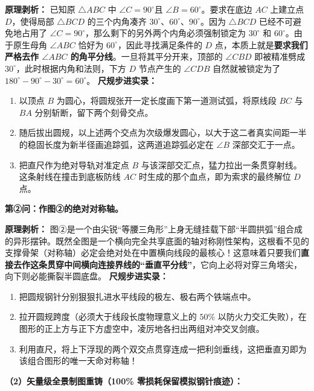 \documentclass[12pt, a4paper]{ctexrep}
\begin{document}
\textbf{原理剥析：} 已知原 $\triangle ABC$ 中 $\angle C = 90^\circ$且 $\angle B = 60^\circ$。要求在底边 $AC$ 上建立点 $D$，使得局部 $\triangle BCD$ 的三个内角凑齐 $30^\circ$、$60^\circ$、$90^\circ$。因为 $\triangle BCD$ 已经不可避免地占用了 $\angle C = 90^\circ$，那么剩下的另外两个内角必须强制锁定为 $30^\circ$ 和 $60^\circ$。由于原生母角 $\angle ABC$ 恰好为 $60^\circ$，因此寻找满足条件的 $D$ 点，本质上就是\textbf{要求我们严格去作 $\angle ABC$ 的角平分线}。一旦将其平分开来，顶部的 $\angle CBD$ 即被精准劈成 $30^\circ$，此时根据内角和法则，下方 $D$ 节点产生的 $\angle CDB$ 自然就被锁定为了 $180^\circ - 90^\circ - 30^\circ = 60^\circ$。
\textbf{尺规步进实录：}
\begin{enumerate}
    \item 以顶点 $B$ 为圆心，将圆规张开一定长度画下第一道测试弧，将原线段 $BC$ 与 $BA$ 分别斩断，留下两个刻骨交点。
    \item 随后拔出圆规，以上述两个交点为次级爆发圆心，以大于这二者真实间距一半的稳固长度为新半径画追踪弧，这两道追踪弧必定在 $\angle B$ 深部交汇于一点。
    \item 把直尺作为绝对导轨对准定点 $B$ 与该深部交汇点，猛力拉出一条贯穿射线。这条射线在撞击到底板防线 $AC$ 时生成的那个血点，即为索求的最终解位 $D$ 点。
\end{enumerate}

\textbf{第②问：作图②的绝对对称轴。}

\textbf{原理剥析：} 图②是一个由尖锐“等腰三角形”上身无缝挂载下部“半圆拱弧”组合成的异形摆钟。既然全图是一个横向完全共享底面的轴对称刚性架构，这根看不见的支撑骨架（对称轴）必定会绝对处在中置横向线段的最核心！这意味着只要我们\textbf{直接去作这条贯穿中间横向连接界线的“垂直平分线”}，它向上必将对穿三角塔尖，向下则必能撕裂半圆底盘。
\textbf{尺规步进实录：}
\begin{enumerate}
    \item 把圆规钢针分别狠狠扎进水平线段的极左、极右两个铁端点中。
    \item 拉开圆规跨度（必须大于线段长度物理意义上的 $50\%$ 以防火力交汇失败），在图形的正上方与正下方虚空中，凌厉地各扫出两组对冲交叉剑痕。
    \item 利用直尺，将上下浮现的两个双交点贯穿连成一把利剑垂线，这把垂直刃即为该组合图形的唯一天命对称轴！
\end{enumerate}

\textbf{（2）矢量级全景制图重铸（100\% 零损耗保留模拟钢针痕迹）：}
\end{document}
